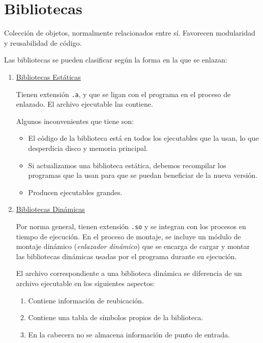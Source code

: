 \section{Bibliotecas}
\begin{definicion}[Biblioteca] Colección de objetos, normalmente relacionados entre sí. Favorecen modularidad y reusabilidad de código.
\end{definicion}

Las bibliotecas se pueden clasificar según la forma en la que se enlazan:
\begin{enumerate}
    \item \underline{Bibliotecas Estáticas}

    Tienen extensión \verb|.a|, y que se ligan con el programa en el proceso de enlazado. El archivo ejecutable las contiene.

    Algunos inconvenientes que tiene son:
    \begin{itemize}
        \item El código de la biblioteca está en todos los ejecutables que la usan, lo que desperdicia disco y memoria principal.

        \item Si actualizamos una biblioteca estática, debemos recompilar los programas que la usan para que se puedan beneficiar de la nueva versión.

        \item Producen ejecutables grandes.
    \end{itemize}

    \item \underline{Bibliotecas Dinámicas}

    Por norma general, tienen extensión \verb|.so| y se integran con los procesos en tiempo de ejecución. En el proceso de montaje, se incluye un módulo de montaje dinámico (\textit{enlazador dinámico}) que se encarga de cargar y montar las bibliotecas dinámicas usadas por el programa durante su ejecución.

    El archivo correspondiente a una biblioteca dinámica se diferencia de un archivo ejecutable en los siguientes aspectos:
    \begin{enumerate}
        \item Contiene información de reubicación.
        \item Contiene una tabla de símbolos propios de la biblioteca.
        \item En la cabecera no se almacena información de punto de entrada.
    \end{enumerate}
\end{enumerate}